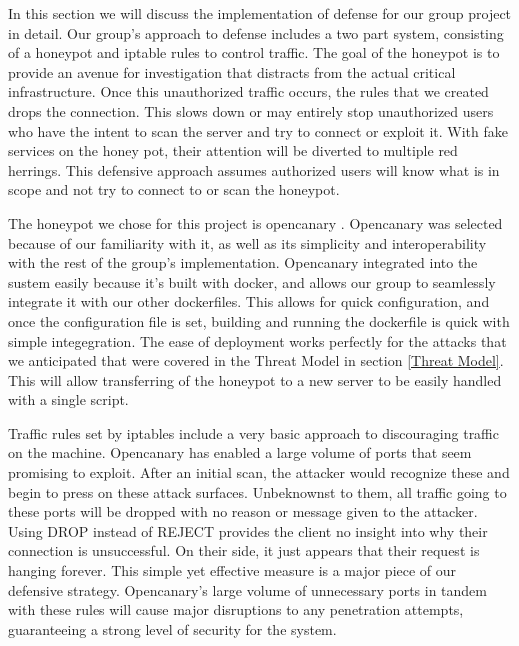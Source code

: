 In this section we will discuss the implementation of defense for our group project in detail. Our group's approach to defense includes a two part system, consisting of a honeypot and iptable rules to control traffic. The goal of the honeypot is to provide an avenue for investigation that distracts from the actual critical infrastructure. Once this unauthorized traffic occurs, the rules that we created drops the connection. This slows down or may entirely stop unauthorized users who have the intent to scan the server and try to connect or exploit it. With fake services on the honey pot, their attention will be diverted to multiple red herrings. This defensive approach assumes authorized users will know what is in scope and not try to connect to or scan the honeypot.

The honeypot we chose for this project is opencanary \cite{opencanary}. Opencanary was selected because of our  familiarity with it, as well as its simplicity and interoperability with the rest of the group's implementation. Opencanary integrated into the sustem easily because it’s built with docker, and allows our group to seamlessly integrate it with our other dockerfiles. This allows for quick configuration, and once the configuration file is set, building and running the dockerfile is quick with simple integegration. The ease of deployment works perfectly for the attacks that we anticipated that were covered in the Threat Model in section \ref{Threat Model}. This will allow transferring of the honeypot to a new server to be easily handled with a single script. 

Traffic rules set by iptables include a very basic approach to discouraging traffic on the machine. Opencanary has enabled a large volume of ports that seem promising to exploit. After an initial scan, the attacker would recognize these and begin to press on these attack surfaces. Unbeknownst to them, all traffic going to these ports will be dropped with no reason or message given to the attacker. Using DROP instead of REJECT provides the client no insight into why their connection is unsuccessful. On their side, it just appears that their request is hanging forever. This simple yet effective measure is a major piece of our defensive strategy. Opencanary’s large volume of unnecessary ports in tandem with these rules will cause major disruptions to any penetration attempts, guaranteeing a strong level of security for the system. 


